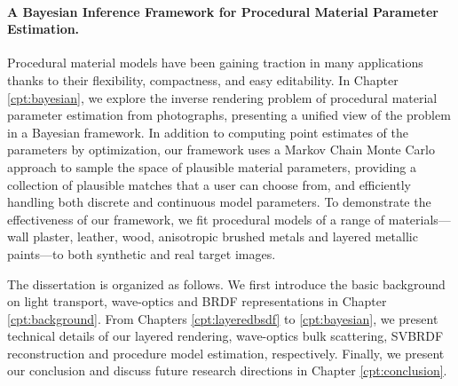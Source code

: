 \paragraph{A Bayesian Inference Framework for Procedural Material Parameter Estimation.}
Procedural material models have been gaining traction in many applications thanks to their flexibility, compactness, and easy editability.
In Chapter \ref{cpt:bayesian}, we explore the inverse rendering problem of procedural material parameter estimation from photographs, presenting a unified view of the problem in a Bayesian framework. In addition to computing point estimates of the parameters by optimization, our framework uses a Markov Chain Monte Carlo approach to sample the space of plausible material parameters, providing a collection of plausible matches that a user can choose from, and efficiently handling both discrete and continuous model parameters. To demonstrate the effectiveness of our framework, we fit procedural models of a range of materials---wall plaster, leather, wood, anisotropic brushed metals and layered metallic paints---to both synthetic and real target images.

The dissertation is organized as follows. We first introduce the basic background on light transport, wave-optics and BRDF representations in Chapter \ref{cpt:background}. From Chapters \ref{cpt:layeredbsdf} to \ref{cpt:bayesian}, we present technical details of our layered rendering, wave-optics bulk scattering, SVBRDF reconstruction and procedure model estimation, respectively. Finally, we present our conclusion and discuss future research directions in Chapter \ref{cpt:conclusion}.